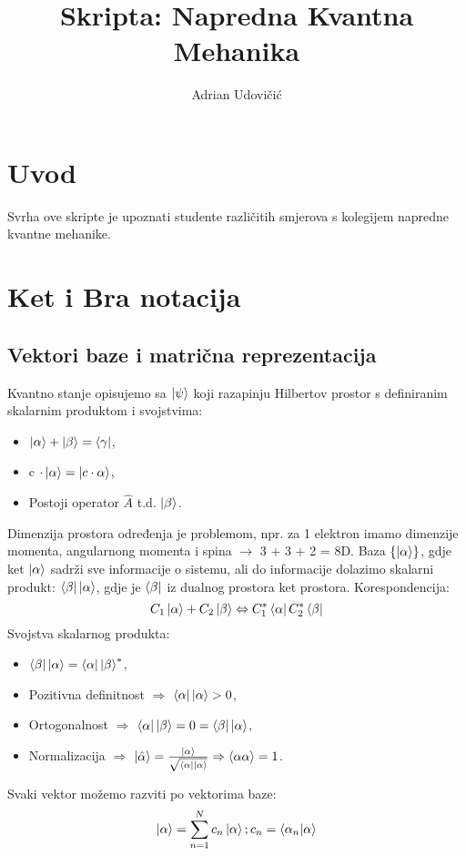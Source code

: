 \documentclass{article}
\title{Skripta: Napredna Kvantna Mehanika}
\author{Adrian Udovičić}
\numberwithin{equation}{section}
\begin{document}
\maketitle
{}
\section*{\centering Uvod}

Svrha ove skripte je upoznati studente različitih smjerova s kolegijem napredne kvantne mehanike.

\vfill

\begin{center}
\tableofcontents
\end{center}
\vfill
\newpage

\section{Ket i Bra notacija}
\subsection{Vektori baze i matrična reprezentacija}
Kvantno stanje opisujemo sa $\ket{\psi}$ koji razapinju Hilbertov prostor s definiranim skalarnim produktom i svojstvima:
\begin{itemize}
	\item $\ket{\alpha} + \ket{\beta} = \bra{\gamma}$,
	\item c $\cdot \ket{\alpha} = \ket{c \cdot \alpha}$,
	\item Postoji operator $\hat{A}$ t.d. $\ket{\beta}$.
\end{itemize}
Dimenzija prostora određenja je problemom, npr. za 1 elektron imamo dimenzije momenta,
angularnong momenta i spina $\rightarrow$ 3 + 3 + 2 = 8D. Baza  $\left\{\ket{\alpha}\right\}$, gdje ket $\ket{\alpha}$ sadrži sve informacije o sistemu, ali do informacije dolazimo skalarni produkt:
$\bra{\beta}\ket{\alpha}$, gdje je $\bra{\beta}$ iz dualnog prostora ket prostora.
Korespondencija: 
\begin{equation}
	C_1\ket{\alpha} + C_2 \ket{\beta} \Leftrightarrow C_1^*\bra{\alpha} C_2^*\bra{\beta}
\end{equation}
Svojstva skalarnog produkta:
\begin{itemize}
	\item  $\bra{\beta}\ket{\alpha} = \bra{\alpha}\ket{\beta}^*$,
	\item Pozitivna definitnost $\Rightarrow$ $\bra{\alpha}\ket{\alpha} > 0$,
	\item Ortogonalnost $\Rightarrow$ $\bra{\alpha}\ket{\beta} = 0 =\bra{\beta}\ket{\alpha}$,
	\item Normalizacija $\Rightarrow$ $\ket{\hat{\alpha}} = \frac{\ket{\alpha}}{\sqrt{\bra{\alpha}\ket{\alpha}}} \Rightarrow \braket{\alpha \alpha} = 1$. 
\end{itemize}
Svaki vektor možemo razviti po vektorima baze:
\begin{equation}
\ket{\alpha} = \sum_{n=1}^{N}c_n\ket{\alpha}; c_n = \braket{\alpha_n|\alpha}
\end{equation}
\end{document}
